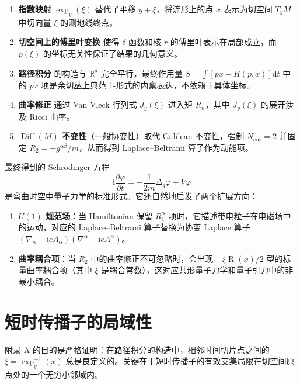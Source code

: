 \documentclass{book}
\newcommand{\mathd}{\mathrm{d}}
\newcommand{\mathi}{\mathrm{i}}
\begin{document}
\begin{enumerate}
  \item \textbf{指数映射} $\exp_y(\xi)$ 替代了平移 $y + \xi$，将流形上的点 $x$ 表示为切空间 $T_yM$ 中切向量 $\xi$ 的测地线终点。
  
  \item \textbf{切空间上的傅里叶变换} 使得 $\delta$ 函数和核 $r$ 的傅里叶表示在局部成立，而 $p(\xi)$ 的坐标无关性保证了结果的几何意义。
  
  \item \textbf{路径积分} 的构造与 $\mathbb{R}^d$ 完全平行，最终作用量 $S = \int [p\dot{x} - H(p,x)]\mathd t$ 中的 $p\dot{x}$ 项是余切丛上典范 1-形式的内禀表达，不依赖于具体坐标。
  
  \item \textbf{曲率修正} 通过 Van Vleck 行列式 $J_y(\xi)$ 进入矩 $R_n$，其中 $J_y(\xi)$ 的展开涉及 Ricci 曲率。
  
  \item \textbf{$\operatorname{Diff}(M)$ 不变性}（一般协变性）取代 Galilean 不变性，强制 $N_\text{cut}=2$ 并固定 $R_2 = -g^{\alpha\beta}/m$，从而得到 Laplace--Beltrami 算子作为动能项。
\end{enumerate}

最终得到的 Schrödinger 方程
\[
\mathi \frac{\partial\varphi}{\partial t} = -\frac{1}{2m} \Delta_g \varphi + V\varphi
\]
是弯曲时空中量子力学的标准形式。它还自然地启发了两个扩展方向：

\begin{enumerate}
  \item \textbf{$U(1)$ 规范场}：当 Hamiltonian 保留 $R_1^\alpha$ 项时，它描述带电粒子在电磁场中的运动，对应的 Laplace--Beltrami 算子替换为协变 Laplace 算子 $(\nabla_\alpha - \mathi e A_\alpha)(\nabla^\alpha - \mathi e A^\alpha)$。
  
  \item \textbf{曲率耦合项}：当 $R_2$ 中的曲率修正不可忽略时，会出现 $-\xi \operatorname{R}(x)/2$ 型的标量曲率耦合项（其中 $\xi$ 是耦合常数），这对应共形量子力学和量子引力中的非最小耦合。
\end{enumerate}

\appendix
\chapter{短时传播子的局域性}\label{appendix:locality}

附录 A 的目的是严格证明：在路径积分的构造中，相邻时间切片点之间的 $\xi = \exp_y^{-1}(x)$ 总是良定义的。关键在于短时传播子的有效支集局限在切空间原点处的一个无穷小邻域内。
\end{document}
